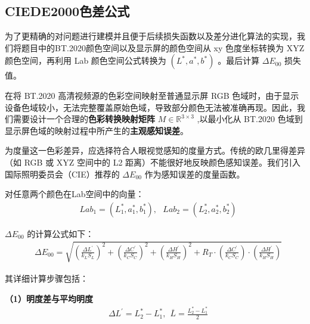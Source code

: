 \subsection[\hspace{-2pt}CIEDE2000色差公式]{{\heiti{} \hspace{-8pt}CIEDE2000色差公式}}\label{subsection2: CIEDE2000色差公式}

为了更精确的对问题进行建模并且便于后续损失函数以及差分进化算法的实现，我们将题目中的BT.2020颜色空间以及显示屏的颜色空间从 xy 色度坐标转换为 XYZ 颜色空间，再利用 Lab 颜色空间公式转换为 $(L^{*},a^{*},b^{*})$ 。最后计算 $\Delta E_{00}$ 损失值。

在将 BT.2020 高清视频源的色彩空间映射至普通显示屏 RGB 色域时，由于显示设备色域较小，无法完整覆盖原始色域，导致部分颜色无法被准确再现。因此，我们需要设计一个合理的\textbf{色彩转换映射矩阵} $M\in \mathbb{R}^{3\times 3}$ ,以最小化从 BT.2020 色域到显示屏色域的映射过程中所产生的\textbf{主观感知误差}。

为度量这一色彩差异，应选择符合人眼视觉感知的度量方式。传统的欧几里得差异（如 RGB 或 XYZ 空间中的 L2 距离）不能很好地反映颜色感知误差。我们引入国际照明委员会（CIE）推荐的 $\Delta E_{00}$ 作为感知误差的度量函数。

对任意两个颜色在Lab空间中的向量：
\begin{equation}
\begin{aligned}
  &Lab_{1} = (L^{*}_{1},a^{*}_{1},b^{*}_{1}),\ \ \ Lab_{2}=(L^{*}_{2},a^{*}_{2},b^{*}_{2})
\end{aligned}
\end{equation}

$\Delta E_{00}$ 的计算公式如下：
\begin{equation}
\begin{aligned}
  &\Delta E_{00}=\sqrt{(\frac{\Delta L^{'}}{k_{L}S_{L}})^{2}+(\frac{\Delta C^{'}}{k_{C}S_{C}})^{2}+(\frac{\Delta H^{'}}{k_{H}S_{H}})^{2}+R_{T}\cdot{(\frac{\Delta C^{'}}{k_{C}S_{C}})}\cdot (\frac{\Delta H^{'}}{k_{H}S_{H}})}
\end{aligned}
\end{equation}

其详细计算步骤包括：

\textbf{（1）明度差与平均明度}
\begin{equation}
\begin{aligned}
   &\Delta L^{'} = L^{*}_{2}-L^{*}_{1},\ \ \overline{L}=\frac{L^{*}_{2}-L^{*}_{1}}{2}
\end{aligned}
\end{equation}

